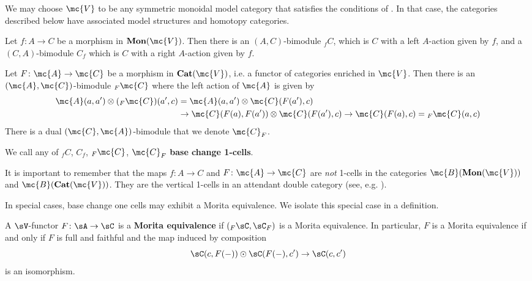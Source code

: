 \documentclass[11pt]{amsart}
\newcommand{\mbf}{\mathbf}
\begin{document}
\begin{rmk}
We may  choose $\mc{V}$ to be any symmetric monoidal model category that satisfies the conditions of \cite[Prop.~6.1]{schwede_shipley}. In that case, the categories described below have associated model structures and homotopy categories. 
\end{rmk}

\begin{defn}\label{defn:base_change_monoid}
 Let $f\colon  A \to C$ be a morphism in $\mbf{Mon}(\mc{V})$. Then there is an $(A, C)$-bimodule  $ _f C$, which is $C$ with a left $A$-action given by $f$,  and a $(C, A)$-bimodule $C_f$ which is $C$ with a right $A$-action given by $f$.
\end{defn}

\begin{defn}\label{defn:base_change_category}
 Let $F\colon  \mc{A} \to \mc{C}$ be a morphism in $\mbf{Cat}(\mc{V})$, i.e. a functor of categories enriched in $\mc{V}$. Then there is an $(\mc{A}, \mc{C})$-bimodule $_F \mc{C}$ where the left action of $\mc{A}$ is given by
  \begin{align*}
  \mc{A}(a, a') \otimes ({_F \mc{C}})(a', c) 
   &= \mc{A}(a, a') \otimes \mc{C}(F(a'), c) 
  \\
  &\to \mc{C}(F(a), F(a')) \otimes \mc{C}(F(a'), c) \to \mc{C}(F(a), c) = {_F \mc{C}(a, c)} 
  \end{align*}
  There is a dual $(\mc{C}, \mc{A})$-bimodule that we denote $\mc{C}_F$. 
\end{defn}

\begin{defn}
We call any of $_f C$, $C_f$, $_F \mc{C}$, $\mc{C}_F$ \textbf{base change 1-cells}.
\end{defn}

\begin{rmk}
  It is important to remember that the maps $f\colon  A \to C$ and $F\colon  \mc{A} \to \mc{C}$ are \textit{not} 1-cells in the categories $\mc{B}(\mbf{Mon}(\mc{V}))$ and $\mc{B}(\mbf{Cat}(\mc{V}))$. They are the vertical 1-cells in an attendant double category (see, e.g. \cite{shulman_framed}).
\end{rmk}

In special cases, base change one cells may exhibit a Morita equivalence. We isolate this special case in a definition. 

\begin{defn}
A $\sV$-functor $F\colon \sA\to \sC$ 
is a {\bf Morita equivalence} if  $({_F\sC},\sC_F)$ is a Morita equivalence.  
In particular, 
 $F$ is a Morita equivalence if and only if $F$ is full and faithful and the map induced by composition  
\[
 \sC(c,F(-))\odot\sC(F(-),c')\to \sC(c,c')
\] 
is an isomorphism.
\end{defn}
\end{document}
